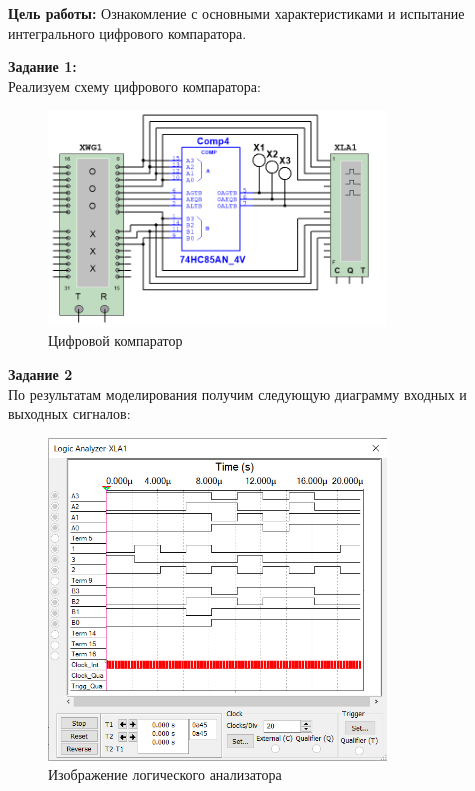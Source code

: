 \documentclass[spec, och, labwork]{shiza}
\begin{document}

\textbf{Цель работы:} Ознакомление с основными характеристиками и испытание интегрального цифрового компаратора.

\textbf{Задание 1:}\\
Реализуем схему цифрового компаратора:

\begin{figure}[H]
    \centering
    \includegraphics[width=0.8\textwidth]{pic3/1.png}
    \caption{Цифровой компаратор}
\end{figure}

\textbf{Задание 2}\\

По результатам моделирования получим следующую диаграмму входных и выходных сигналов:

\begin{figure}[H]
    \centering
    \includegraphics[width=0.8\textwidth]{pic3/2.png}
    \caption{Изображение логического анализатора}
\end{figure}
\end{document}
